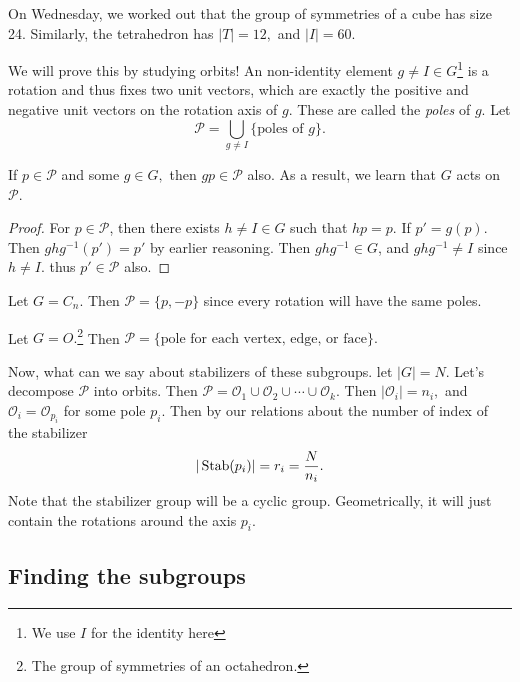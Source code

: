 On Wednesday, we worked out that the group of symmetries of a cube has size 24. Similarly, the tetrahedron has $|T| = 12,$ and $|I| = 60.$

We will prove this by studying orbits! An non-identity element $g \neq I \in G$\footnote{We use $I$ for the identity here} is a rotation and thus fixes two unit vectors, which are exactly the positive and negative unit vectors on the rotation axis of $g$. These are called the \emph{poles} of $g.$ Let 
\[
\mathcal{P} = \bigcup_{g \neq I} \{\text{poles of }g\}.
\]

\begin{lemma}
If $p \in \mathcal{P}$ and some $g \in G,$ then $gp \in \mathcal{P}$ also. As a result, we learn that $G$ acts on $\mathcal{P}$. 
\end{lemma}

\begin{proof}
For $p \in \mathcal{P}$, then there exists $h \neq I \in G$ such that $hp = p.$ If $p' = g(p).$ Then $ghg^{-1}(p') = p'$ by earlier reasoning. Then $ghg^{-1} \in G$, and $ghg^{-1}\neq I$ since $h \neq I.$ thus $p' \in \mathcal{P}$ also.
\end{proof}

\begin{example}
\label{CyclicPoles}
Let $G = C_n$. Then $\mathcal{P} = \{p, -p\}$ since every rotation will have the same poles.
\end{example}

\begin{example}
\label{PolyhedraPoles}
Let $G = O.$\footnote{The group of symmetries of an octahedron.} Then $\mathcal{P} = \{\text{pole for each vertex, edge, or face}\}.$ %
\end{example}

Now, what can we say about stabilizers of these subgroups. let $|G| = N.$ Let's decompose $\mathcal{P}$ into orbits. Then $\mathcal{P} = \mathcal{O}_1 \cup \mathcal{O}_2 \cup \cdots \cup \mathcal{O}_k$. Then $|\mathcal{O}_i| = n_i,$ and $\mathcal{O}_i = \mathcal{O}_{p_i}$ for some pole $p_i$. Then by our relations about the number of index of the stabilizer
\[
|\operatorname{Stab}(p_i)| = r_i = \frac{N}{n_i}.
\]
Note that the stabilizer group will be a cyclic group.
Geometrically, it will just contain the rotations around the axis $p_i$.

\subsection{Finding the subgroups}

